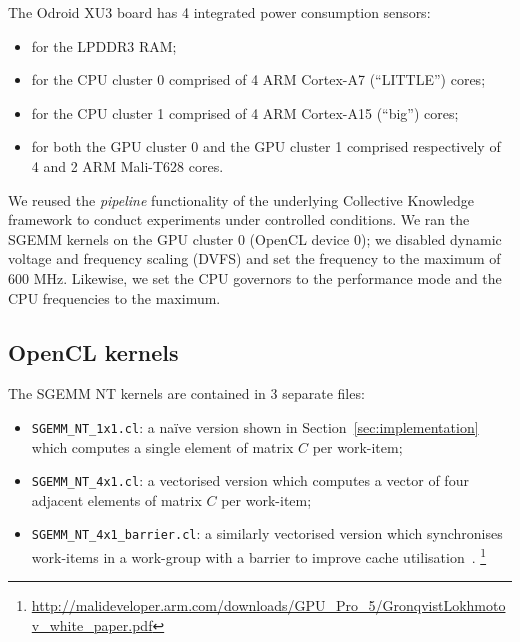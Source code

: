 \documentclass{acm_proc_article-sp} %
\begin{document}
The Odroid XU3 board has 4 integrated power consumption sensors:
%
\begin{itemize}

  \item for the LPDDR3 RAM;

  \item for the CPU cluster 0 comprised of 4 ARM Cortex-A7 (``LITTLE'') cores;

  \item for the CPU cluster 1 comprised of 4 ARM Cortex-A15 (``big'') cores;

  \item for both the GPU cluster 0 and the GPU cluster 1 comprised respectively
  of 4 and 2 ARM Mali-T628 cores.

\end{itemize}
%
We reused the {\em pipeline} functionality of the underlying Collective
Knowledge framework to conduct experiments under controlled conditions.
%
We ran the SGEMM kernels on the GPU cluster 0 (OpenCL device 0); we disabled
dynamic voltage and frequency scaling (DVFS) and set the frequency to the
maximum of 600 MHz.
%
Likewise, we set the CPU governors to the performance mode and the CPU
frequencies to the maximum.
%

\subsection{OpenCL kernels}

The SGEMM NT kernels are contained in 3 separate files:
%
\begin{itemize}

  \item \verb|SGEMM_NT_1x1.cl|: a na\"ive version shown in
  Section~\ref{sec:implementation} which computes a single element of matrix $C$ per
  work-item;

  \item \verb|SGEMM_NT_4x1.cl|: a vectorised version which computes a vector of
  four adjacent elements of matrix $C$ per work-item;

  \item \verb|SGEMM_NT_4x1_barrier.cl|: a similarly vectorised version which
  synchronises work-items in a work-group with a barrier to improve cache
  utilisation~\cite{Gronqvist:2014}.%
  \footnote{\url{http://malideveloper.arm.com/downloads/GPU_Pro_5/GronqvistLokhmotov_white_paper.pdf}}

\end{itemize}
%
\end{document}
